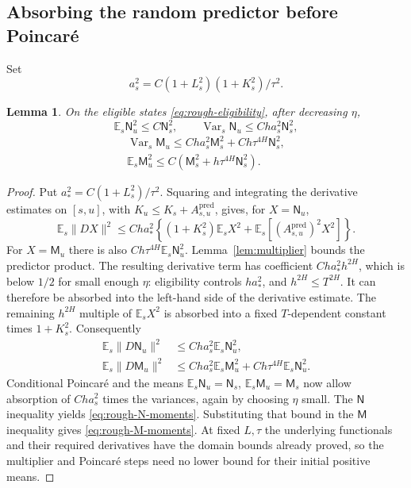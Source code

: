 \documentclass[11pt,a4paper]{amsart}
\theoremstyle{plain}
\newtheorem{lemma}[theorem]{Lemma}
\theoremstyle{definition}
\theoremstyle{remark}
\DeclareMathOperator{\Var}{Var}
\newcommand{\EE}{\mathbb{E}}
\newcommand{\Es}{\EE_s}
\newcommand{\pred}{\mathrm{pred}}
\begin{document}
\subsection{Absorbing the random predictor before Poincar\'e}
Set
\begin{equation}\label{eq:rough-as}
 a_s^2=C(1+L_s^2)(1+K_s^2)/\tau^2.
\end{equation}
\begin{lemma}\label{lem:rough-moments}
On the eligible states \eqref{eq:rough-eligibility}, after decreasing $\eta$,
\begin{equation}\label{eq:rough-N-moments}
 \Es\mathsf N_u^2\le C\mathsf N_s^2,
 \qquad \Var_s\mathsf N_u\le C h a_s^2\mathsf N_s^2,
\end{equation}
\begin{equation}\label{eq:rough-M-moments}
 \begin{gathered}
 \Var_s\mathsf M_u\le C h a_s^2\mathsf M_s^2
                             +C h\tau^{4H}\mathsf N_s^2,\\
 \Es\mathsf M_u^2\le C(\mathsf M_s^2+h\tau^{4H}\mathsf N_s^2).
 \end{gathered}
\end{equation}
\end{lemma}
\begin{proof}
Put $a_*^2=C(1+L_s^2)/\tau^2$. Squaring and integrating the derivative estimates on $[s,u]$, with $K_u\le K_s+A_{s,u}^{\pred}$, gives, for $X=\mathsf N_u$,
\begin{equation}\label{eq:predictor-before-absorption}
 \Es\|DX\|^2\le C h a_*^2\left\{
      (1+K_s^2)\Es X^2+\Es[(A_{s,u}^{\pred})^2X^2]\right\}.
\end{equation}
For $X=\mathsf M_u$ there is also $C h\tau^{4H}\Es\mathsf N_u^2$. Lemma~\ref{lem:multiplier} bounds the predictor product. The resulting derivative term has coefficient $C h a_*^2h^{2H}$, which is below $1/2$ for small enough $\eta$: eligibility controls $h a_*^2$, and $h^{2H}\le T^{2H}$. It can therefore be absorbed into the left-hand side of the derivative estimate. The remaining $h^{2H}$ multiple of $\Es X^2$ is absorbed into a fixed $T$-dependent constant times $1+K_s^2$. Consequently
\begin{equation}\label{eq:rough-absorbed-derivatives}
 \begin{aligned}
 \Es\|D\mathsf N_u\|^2&\le C h a_s^2\Es\mathsf N_u^2,\\
 \Es\|D\mathsf M_u\|^2&\le C h a_s^2\Es\mathsf M_u^2
                            +C h\tau^{4H}\Es\mathsf N_u^2.
 \end{aligned}
\end{equation}
Conditional Poincar\'e and the means $\Es\mathsf N_u=\mathsf N_s$, $\Es\mathsf M_u=\mathsf M_s$ now allow absorption of $C h a_s^2$ times the variances, again by choosing $\eta$ small. The $\mathsf N$ inequality yields \eqref{eq:rough-N-moments}. Substituting that bound in the $\mathsf M$ inequality gives \eqref{eq:rough-M-moments}. At fixed $L,\tau$ the underlying functionals and their required derivatives have the domain bounds already proved, so the multiplier and Poincar\'e steps need no lower bound for their initial positive means.
\end{proof}
\end{document}
